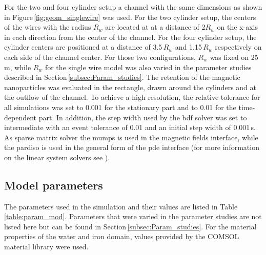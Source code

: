 For the two and four cylinder setup a channel with the same dimensions as shown in Figure\,\ref{fig:geom_singlewire} was used. For the two cylinder setup, the centers of the wires with the radius $R_{w}$ are located at at a distance of 2$R_{w}$ on the x-axis in each direction from the center of the channel. For the four cylinder setup, the cylinder centers are positioned at a distance of 3.5\,$R_{w}$ and 1.15\,$R_{w}$ respectively on each side of the channel center. For those two configurations, $R_{w}$ was fixed on 25\,\textmu m, while $R_{w}$ for the single wire model was also varied in the parameter studies described in Section\,\ref{subsec:Param_studies}. The retention of the magnetic nanoparticles was evaluated in the rectangle, drawn around the cylinders and at the outflow of the channel. To achieve a high resolution, the relative tolerance for all simulations was set to 0.001 for the stationary part and to 0.01 for the time-dependent part. In addition, the step width used by the \gls{bdf} solver was set to intermediate with an event tolerance of 0.01 and an initial step width of 0.001\,s. As sparse matrix solver the \gls{mumps} is used in the magnetic fields interface, while the \gls{pardiso} is used in the general form of the \gls{pde} interface (for more information on the linear system solvers see \cite{ComsolRefManual}).   

\subsection{Model parameters}
\label{subsec:Cond_param}

The parameters used in the simulation and their values are listed in Table\,\ref{table:param_mod}. Parameters that were varied in the parameter studies are not listed here but can be found in Section\,\ref{subsec:Param_studies}. For the material properties of the water and iron domain, values provided by the COMSOL material library were used.   

